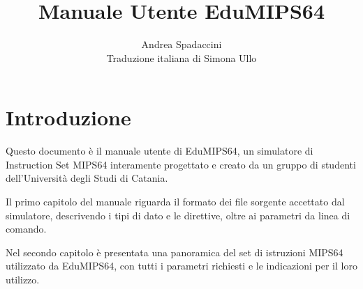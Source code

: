 \documentclass[12pt]{report}
\author{Andrea Spadaccini\\Traduzione italiana di Simona Ullo}
\title{Manuale Utente EduMIPS64 \EV}
\newcommand{\EM}{EduMIPS64}
\newcommand{\MS}{MIPS64}
\begin{document}
\setlength{\baselineskip}{1.60\baselineskip} %

\newlength{\centeroffset}
\setlength{\centeroffset}{-0.5\oddsidemargin}
\addtolength{\centeroffset}{0.5\evensidemargin}
\thispagestyle{empty}
\noindent\hspace*{\centeroffset}

\noindent\hspace*{\centeroffset}



\pagebreak

\tableofcontents
\listoftables
\lstlistoflistings
\chapter{Introduzione}
Questo documento \`e il manuale utente di \EM{}, un simulatore di Instruction
Set \MS{} interamente progettato e creato da un gruppo di studenti
dell'Universit\`a degli Studi di Catania.

Il primo capitolo del manuale riguarda il formato dei file sorgente accettato dal simulatore,
descrivendo i tipi di dato e le direttive, oltre ai parametri da linea di comando.

Nel secondo capitolo \`{e} presentata una panoramica del set di istruzioni  \MS{}
utilizzato da \EM{}, con tutti i parametri richiesti e le indicazioni per il loro utilizzo.
\end{document}
